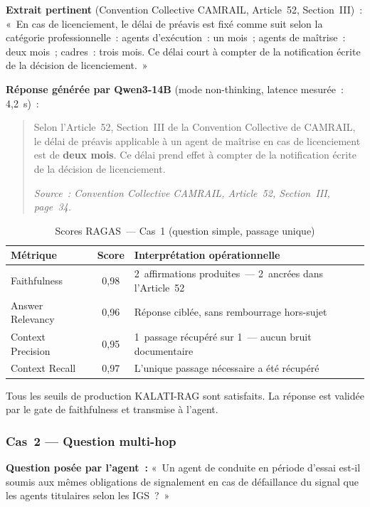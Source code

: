 \documentclass[12pt,a4paper]{report}
\begin{document}
\textbf{Extrait pertinent} (Convention Collective CAMRAIL, Article~52, Section~III)~: «~En cas
de licenciement, le délai de préavis est fixé comme suit selon la catégorie professionnelle~:
agents d'exécution~: un mois~; agents de maîtrise~: deux mois~; cadres~: trois mois. Ce délai
court à compter de la notification écrite de la décision de licenciement.~»

\textbf{Réponse générée par Qwen3-14B} (mode non-thinking, latence mesurée~: 4,2~s)~:

\begin{quote}
Selon l'Article~52, Section~III de la Convention Collective de CAMRAIL, le délai de préavis
applicable à un agent de maîtrise en cas de licenciement est de \textbf{deux mois}. Ce délai
prend effet à compter de la notification écrite de la décision de licenciement.

\textit{Source~: Convention Collective CAMRAIL, Article~52, Section~III, page~34.}
\end{quote}

\begin{table}[p]
\centering
\caption{Scores RAGAS~--- Cas~1 (question simple, passage unique)}
\label{tab:ragas-cas1}
\renewcommand{\arraystretch}{1.4}
\begin{tabularx}{\linewidth}{@{} l c X @{}}
\toprule
\textbf{Métrique} & \textbf{Score} & \textbf{Interprétation opérationnelle} \\
\midrule
Faithfulness & 0,98 & 2~affirmations produites~--- 2~ancrées dans l'Article~52 \\
Answer Relevancy & 0,96 & Réponse ciblée, sans rembourrage hors-sujet \\
Context Precision & 0,95 & 1~passage récupéré sur 1~--- aucun bruit documentaire \\
Context Recall & 0,97 & L'unique passage nécessaire a été récupéré \\
\bottomrule
\end{tabularx}
\end{table}

Tous les seuils de production KALATI-RAG sont satisfaits. La réponse est validée par le gate
de faithfulness et transmise à l'agent.

\subsubsection*{Cas~2 --- Question multi-hop}

\textbf{Question posée par l'agent~:} «~Un agent de conduite en période d'essai est-il soumis
aux mêmes obligations de signalement en cas de défaillance du signal que les agents titulaires
selon les IGS~?~»
\end{document}
